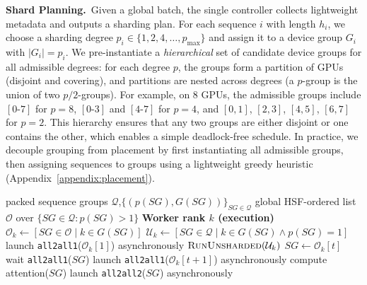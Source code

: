 \noindent\textbf{Shard Planning.}~Given a global batch, the single controller collects lightweight metadata and outputs a sharding plan. For each sequence $i$ with length $h_i$, we choose a sharding degree $p_i \in \{1,2,4,\dots,p_{\max}\}$ and assign it to a device group $G_i$ with $|G_i| = p_i$. We pre-instantiate a \emph{hierarchical} set of candidate device groups for all admissible degrees: for each degree $p$, the groups form a partition of GPUs (disjoint and covering), and partitions are nested across degrees (a $p$-group is the union of two $p/2$-groups). For example, on 8 GPUs, the admissible groups include $[0\text{-}7]$ for $p{=}8$, $[0\text{-}3]$ and $[4\text{-}7]$ for $p{=}4$, and $[0,1]$, $[2,3]$, $[4,5]$, $[6,7]$ for $p{=}2$. This hierarchy ensures that any two groups are either disjoint or one contains the other, which enables a simple deadlock-free schedule. In practice, we decouple grouping from placement by first instantiating all admissible groups, then assigning sequences to groups using a lightweight greedy heuristic (Appendix~\ref{appendix:placement}).


\begin{algorithm}[!t]
    \renewcommand{\algorithmiccomment}[1]{\hfill{\color{red}\footnotesize$\vartriangleright$~\textit{#1}}}
    \caption{FlexUlysses Forward Attention Execution.}
    \label{alg:flexulysses_step}
    \begin{algorithmic}[1]
        \Require packed sequence groups $\mathcal{Q}$,$\{(p(SG),G(SG))\}_{SG\in\mathcal{Q}}$
        \Require global HSF-ordered list $\mathcal{O}$ over $\{SG\in\mathcal{Q}:p(SG)>1\}$
        \Statex \textbf{Worker rank $k$ (execution)}
        \State $\mathcal{O}_k \gets [SG\in\mathcal{O}\mid k\in G(SG)]$ 
        \State $\mathcal{U}_k \gets [SG\in\mathcal{Q}\mid k\in G(SG)\wedge p(SG)=1]$ 
         \State launch \texttt{all2all1}($\mathcal{O}_k[1]$) asynchronously  \EndIf
        \State $\Call{RunUnsharded}{\mathcal{U}_k}$ 
            \State $SG \gets \mathcal{O}_k[t]$
            \State wait \texttt{all2all1}($SG$)
             \State launch \texttt{all2all1}($\mathcal{O}_k[t{+}1]$) asynchronously  \EndIf
            \State compute attention($SG$)
            \State launch \texttt{all2all2}($SG$) asynchronously 
        \EndFor
    \end{algorithmic}
\end{algorithm}

